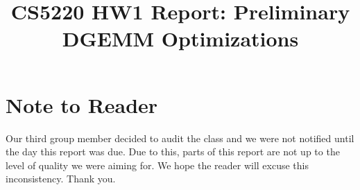 \documentclass{cbxnsf}
\begin{document}

\title{CS5220 HW1 Report: Preliminary DGEMM Optimizations}


\makedescriptiontitle
\vspace{0.1in}





\section{Note to Reader}
Our third group member decided to audit the class and we were not
notified until the day this report was due. Due to this, parts of this
report are not up to the level of quality we were aiming for. We hope the
reader will excuse this inconsistency. Thank you.
\end{document}
